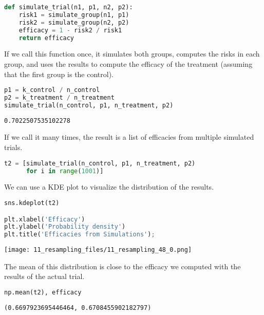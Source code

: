 \begin{lstlisting}[language=Python,style=source]
def simulate_trial(n1, p1, n2, p2):
    risk1 = simulate_group(n1, p1)
    risk2 = simulate_group(n2, p2)
    efficacy = 1 - risk2 / risk1
    return efficacy
\end{lstlisting}

If we call this function once, it simulates both groups, computes the
risks in each group, and uses the results to compute the efficacy of the
treatment (assuming that the first group is the control).

\begin{lstlisting}[language=Python,style=source]
p1 = k_control / n_control
p2 = k_treatment / n_treatment
simulate_trial(n_control, p1, n_treatment, p2)
\end{lstlisting}

\begin{lstlisting}[style=output]
0.7022507535102278
\end{lstlisting}

If we call it many times, the result is a list of efficacies from
multiple simulated trials.

\begin{lstlisting}[language=Python,style=source]
t2 = [simulate_trial(n_control, p1, n_treatment, p2)
      for i in range(1001)]
\end{lstlisting}

We can use a KDE plot to visualize the distribution of the results.

\begin{lstlisting}[language=Python,style=source]
sns.kdeplot(t2)

plt.xlabel('Efficacy')
plt.ylabel('Probability density')
plt.title('Efficacies from Simulations');
\end{lstlisting}

\begin{center}
\texttt{[image: 11\_resampling\_files/11\_resampling\_48\_0.png]}
\end{center}

The mean of this distribution is close to the efficacy we computed with
the results of the actual trial.

\begin{lstlisting}[language=Python,style=source]
np.mean(t2), efficacy
\end{lstlisting}

\begin{lstlisting}[style=output]
(0.6697923695446464, 0.6708455902182797)
\end{lstlisting}

